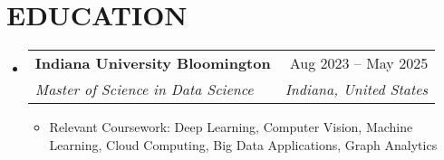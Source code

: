 \documentclass[letterpaper,11pt]{article}
\makeatletter
\newcommand{\resumeItem}[1]{
  \item\small{
    {#1 \vspace{-4pt}}
  }
}
\newcommand{\resumeSubheading}[4]{
  \vspace{-2pt}\item
    \begin{tabular*}{0.97\textwidth}[t]{l@{\extracolsep{\fill}}r}
      \textbf{#1} & #2 \\
      \textit{\small#3} & \textit{\small #4} \\
    \end{tabular*}\vspace{-7pt}
}
\newcommand{\resumeSubHeadingListStart}{\begin{itemize}[leftmargin=0.15in, label={}]}
\newcommand{\resumeSubHeadingListEnd}{\end{itemize}}
\newcommand{\resumeItemListStart}{\begin{itemize}}
\newcommand{\resumeItemListEnd}{\end{itemize}\vspace{-5pt}}
\makeatother
\begin{document}
\section{\textbf{EDUCATION}}
  \resumeSubHeadingListStart
  
    \resumeSubheading
      {Indiana University Bloomington}{\hfill Aug 2023 -- May 2025}
      {Master of Science in Data Science}{Indiana, United States}
      \resumeItemListStart
        \resumeItem{Relevant Coursework: Deep Learning, Computer Vision, Machine Learning, Cloud Computing, Big Data Applications, Graph Analytics}
      \resumeItemListEnd
    
  \resumeSubHeadingListEnd
\end{document}
